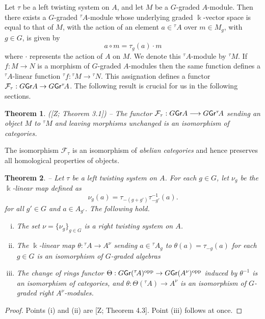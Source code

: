 \documentclass[twoside,11pt]{article}
\renewcommand{\k}{\Bbbk}
\newcommand{\F}{{\mathcal F}}
\newcommand{\GrMod}{{\sf Gr}}
\newcommand{\opp}{{\rm opp}}
\newtheorem{subtheorem}{Theorem}[subsection]
\begin{document}
Let $\tau$ be a left twisting system on $A$, and let $M$ be a $G$-graded $A$-module. Then
there exists a $G$-graded ${}^\tau \! A$-module whose underlying graded $\k$-vector space is
equal to that of $M$, with the action of an element $a \in {}^\tau\! A$ over $m \in M_g$,
with $g \in G$, is given by
\[
 a \circ m = \tau_g (a) \cdot m
\]
where $\cdot$ represents the action of $A$ on $M$. We denote this ${}^\tau\! A$-module by
${}^\tau M$. If $f: M \to N$ is a morphism of $G$-graded $A$-modules then the same
function defines a ${}^\tau\! A$-linear function ${}^\tau\! f: {}^\tau\!M \to {}^\tau\!N$.
This assignation defines a functor $\F_\tau: G\GrMod A \to G\GrMod {}^\tau\!A$.
The following result is crucial for us in the following sections.
\begin{subtheorem} ([Z; Theorem 3.1]) --
\label{category-isomorphism}
The functor $\F_\tau : G\GrMod A \longrightarrow G\GrMod {}^\tau\! A$ sending an object
$M$ to ${}^\tau\! M$ and leaving morphisms unchanged is an isomorphism of categories.
\end{subtheorem}
The isomorphism $\F_\tau$ is an isomorphism of \emph{abelian categories} and hence
preserves all homological properties of objects.

\begin{subtheorem} --
\label{left-right-TS}
Let $\tau$ be a left twisting system on $A$. For each $g\in G$, let $\nu_g$ be the
$\k$-linear map defined as
\[
	\nu_g(a) = \tau_{-(g+g')}\tau_{-g'}^{-1}(a).
\] 
for all $g' \in G$ and $a \in A_{g'}$. The following hold.
\begin{enumerate}[(i)]
	\item The set $\nu = \{\nu_g\}_{g\in G}$ is a right twisting system on $A$.
	\item The $\k$-linear map $\theta: {}^\tau\! A \to A^\nu$ sending $a \in {}^\tau\!
		A_g$ to $\theta(a) = \tau_{-g}(a)$ for each $g \in G$ is an isomorphism of
		$G$-graded algebras
	\item The change of rings functor $\Theta: G\GrMod ({}^\tau\! A)^\opp \to
		G\GrMod (A^\nu)^\opp$ induced by $\theta^{-1}$ is an isomorphism of
		categories, and $\theta: \Theta({}^\tau\! A) \to A^\nu$ is an isomorphism
		of $G$-graded right $A^\nu$-modules.
	\end{enumerate}
\end{subtheorem}
\begin{proof}
Points (i) and (ii) are [Z; Theorem 4.3]. Point (iii) follows at once. 
\end{proof}
\end{document}
